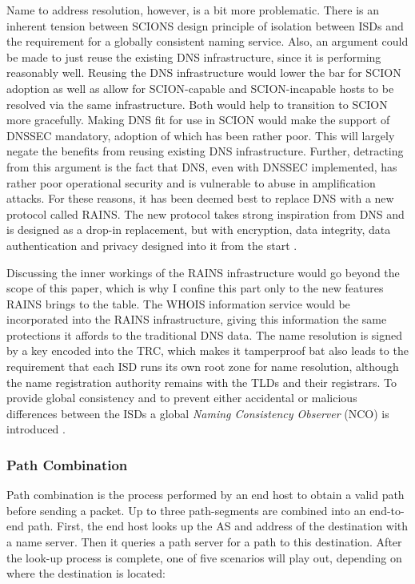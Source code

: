 \documentclass[../eva1_scion.tex]{subfiles}
\begin{document}
    Name to address resolution, however, is a bit more problematic. There is an inherent tension between SCIONS design principle of isolation between ISDs and the requirement for a globally consistent naming service. Also, an argument could be made to just reuse the existing DNS infrastructure, since it is performing reasonably well. Reusing the DNS infrastructure would lower the bar for SCION adoption as well as allow for SCION-capable and SCION-incapable hosts to be resolved via the same infrastructure\cite{name_resolution}. Both would help to transition to SCION more gracefully. Making DNS fit for use in SCION would make the support of DNSSEC mandatory, adoption of which has been rather poor. This will largely negate the benefits from reusing existing DNS infrastructure. Further, detracting from this argument is the fact that DNS, even with DNSSEC implemented, has rather poor operational security and is vulnerable to abuse in amplification attacks. For these reasons, it has been deemed best to replace DNS with a new protocol called RAINS. The new protocol takes strong inspiration from DNS and is designed as a drop-in replacement, but with encryption, data integrity, data authentication and privacy designed into it from the start \cite{name_resolution}.

    Discussing the inner workings of the RAINS infrastructure would go beyond the scope of this paper, which is why I confine this part only to the new features RAINS brings to the table. The WHOIS information service would be incorporated into the RAINS infrastructure, giving this information the same protections it affords to the traditional DNS data. The name resolution is signed by a key encoded into the TRC, which makes it tamperproof bat also leads to the requirement that each ISD runs its own root zone for name resolution, although the name registration authority remains with the TLDs and their registrars. To provide global consistency and to prevent either accidental or malicious differences between the ISDs a global \textit{Naming Consistency Observer} (NCO) is introduced \cite{name_resolution}.

    \subsubsection{Path Combination} \label{sssec:path_assembly}
    Path combination is the process performed by an end host to obtain a valid path before sending a packet. Up to three path-segments are combined into an end-to-end path. First, the end host looks up the AS and address of the destination with a name server. Then it queries a path server for a path to this destination. After the look-up process is complete, one of five scenarios will play out, depending on where the destination is located:
\end{document}
